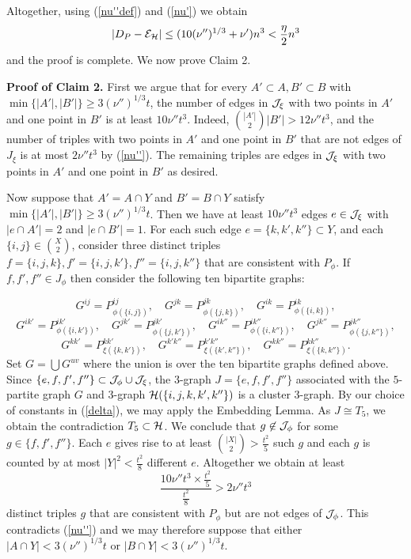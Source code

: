 \documentclass[11pt]{article}
\begin{document}
Altogether, using (\ref{nu''def}) and (\ref{nu'}) we  obtain
$$|D_P-{\cal E}_{\mathcal{H}}| \le (10(\nu'')^{1/3}+\nu')n^3<\frac{\eta}{2} n^3$$
and the proof is complete.  We now  prove Claim 2.

{\bf Proof of Claim 2.} First we argue that for every $A' \subset A,
B' \subset B$ with $\min\{|A'|, |B'|\}\ge 3(\nu'')^{1/3}t$, the
number of edges in ${\cal J}_{\xi}$ with two points in $A'$ and one point
in $B'$ is at least $10\nu''t^3$.  Indeed, ${|A'|\choose
2}|B'|>12\nu''t^3$, and the number of triples with two points in $A'$
and one point in $B'$ that are not edges of $J_{\xi}$ is at most $2\nu''t^3$
by (\ref{nu''}). The remaining triples are edges in ${\cal J}_{\xi}$ with
two points in $A'$ and one point in $B'$  as desired.

Now suppose that $A'=A \cap Y$ and $B'=B \cap Y$ satisfy
$\min\{|A'|, |B'|\}\ge 3(\nu'')^{1/3}t$.  Then we have at least
$10\nu''t^3$ edges $e \in {\cal J}_{\xi}$ with $|e \cap A'|=2$ and $|e
\cap B'|=1$.  For each such edge $e=\{k,k',k''\}\subset Y$, and each
$\{i,j\} \in {X\choose 2}$, consider three distinct triples
$f=\{i,j,k\},f'=\{i,j,k'\}, f''=\{i,j,k''\}$ that are consistent
with $P_{\phi}$. If $f, f', f'' \in J_{\phi}$ then consider the
following ten bipartite graphs:

$$G^{ij}=P_{\phi(\{i,j\})}^{ij}, \quad G^{jk}=P_{\phi(\{j,k\})}^{jk}, \quad G^{ik}=P_{\phi(\{i,k\})}^{ik},$$
$$G^{ik'}=P_{\phi(\{i,k'\})}^{ik'},\quad
G^{jk'}=P_{\phi(\{j,k'\})}^{jk'},\quad
 G^{ik''}=P_{\phi(\{i,k''\})}^{ik''},\quad
G^{jk''}=P_{\phi(\{j,k''\})}^{jk''},$$
 $$G^{kk'}=P_{\xi(\{k, k'\})}^{kk'},\quad G^{k'k''}=P_{\xi(\{k', k''\})}^{k'k''},\quad G^{kk''}=P_{\xi(\{k, k''\})}^{kk''}.$$
Set $G=\bigcup G^{uv}$ where the union is over the ten bipartite
graphs defined above.
 Since $\{e,f,f', f''\} \subset {\cal J}_{\phi} \cup {\cal J}_{\xi}$,  the $3$-graph  $J=\{e, f,f', f''\}$ associated with the
 $5$-partite graph $G$ and $3$-graph $\mathcal{H}(\{i,j,k,k',k''\})$ is a cluster $3$-graph.
 By our choice of constants in (\ref{delta}), we may apply the Embedding Lemma. As $J \cong T_5$,
   we obtain the contradiction  $T_5 \subset
\mathcal{H}$. We conclude that $g\not\in {\cal J}_{\phi}$ for some $g\in \{f, f',
f''\}$.  Each $e$ gives rise to at least ${|X| \choose
2}>\frac{t^2}{5}$ such $g$ and each $g$ is counted by at most
$|Y|^2<\frac{t^2}{8}$ different $e$. Altogether we
obtain at least
$$\frac{10\nu'' t^3 \times \frac{t^2}{5}}{\frac{t^2}{8}} > 2\nu'' t^3$$
distinct triples $g$ that are consistent with  $P_{\phi}$ but are
not edges of ${\cal J}_{\phi}$.  This contradicts (\ref{nu''}) and we may
therefore suppose that either $|A \cap Y|<3(\nu'')^{1/3}t$ or $|B
\cap Y|<3(\nu'')^{1/3}t$.
\end{document}
